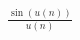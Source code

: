 \documentclass[preview]{standalone}
\begin{document}
\begin{align*}
\frac {\sin(u(n))} {u(n)}
\end{align*}
\end{document}
